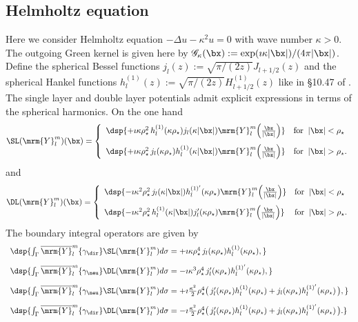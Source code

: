 \documentclass[a4paper,11pt]{article}
\begin{document}
\subsection{Helmholtz equation}\label{Helmholtz3D}

Here we consider Helmholtz equation $-\Delta u-\kappa^{2} u =0$ with wave number $\kappa>0$. The outgoing Green kernel
is given here by $\mathscr{G}_{\kappa}(\bx):=\exp(\imath\kappa\vert\bx\vert)/(4\pi\vert \bx\vert)$.
Define the spherical Bessel functions $j_{l}(z) := \sqrt{\pi/(2z)}J_{l+1/2}(z)$ and the spherical Hankel functions
$h_{l}^{(1)}(z):= \sqrt{\pi/(2z)}H^{(1)}_{l+1/2}(z)$ like in \S 10.47 of \cite{MR2723248}.
The single layer and double layer potentials admit explicit expressions in terms of the spherical harmonics.
On the one hand\\
$$
\SL(\mrm{Y}_{l}^{m})(\bx) =
\left\{\begin{array}{ll}
\dsp{+\imath\kappa\rho_{\star}^{2}\, h^{(1)}_{l}(\kappa\rho_{\star})j_{l}(\kappa\vert \bx\vert)\mrm{Y}_{l}^{m}\Big(\frac{\bx}{\vert\bx\vert}\Big)} & \textrm{for}\;\;\vert \bx\vert<\rho_{\star}\\[10pt]
\dsp{+\imath\kappa\rho_{\star}^{2}\, j_{l}(\kappa\rho_{\star})h^{(1)}_{l}(\kappa\vert \bx\vert)\mrm{Y}_{l}^{m}\Big(\frac{\bx}{\vert\bx\vert}\Big)   } & \textrm{for}\;\;\vert\bx\vert>\rho_{\star}.
\end{array}\right.
$$
and
$$
\DL(\mrm{Y}_{l}^{m})(\bx) =
\left\{\begin{array}{ll}
\dsp{-\imath\kappa^{2}\rho_{\star}^{2}\, j_{l}(\kappa\vert \bx\vert)h^{(1)'}_{l}(\kappa\rho_{\star})
\mrm{Y}_{l}^{m}\Big(\frac{\bx}{\vert\bx\vert}\Big) }
& \textrm{for}\;\;\vert\bx\vert<\rho_{\star}\\[10pt]
\dsp{-\imath\kappa^{2}\rho_{\star}^{2}\, h^{(1)}_{l}(\kappa\vert \bx\vert)j_{l}'(\kappa\rho_{\star})
\mrm{Y}_{l}^{m}\Big(\frac{\bx}{\vert\bx\vert}\Big) }
& \textrm{for}\;\;\vert\bx\vert>\rho_{\star}.
\end{array}\right.
$$
The boundary integral operators are given by
$$
\begin{array}{l}
\dsp{ \int_{\Gamma}\overline{\mrm{Y}}_{l}^{m}\{\gamma_{\dir}\}\SL(\mrm{Y}_{l}^{m}) d\sigma 
= +\imath\kappa \rho_{\star}^{4}\,j_{l}(\kappa\rho_{\star})h_{l}^{(1)}(\kappa\rho_{\star}), }\\[10pt]
\dsp{ \int_{\Gamma}\overline{\mrm{Y}}_{l}^{m}\{\gamma_{\neu}\}\DL(\mrm{Y}_{l}^{m}) d\sigma 
= -\imath\kappa^{3}\rho_{\star}^{4} \,j_{l}'(\kappa\rho_{\star})h_{l}^{(1)'}(\kappa\rho_{\star}), }\\[10pt]
\dsp{ \int_{\Gamma}\overline{\mrm{Y}}_{l}^{m}\{\gamma_{\neu}\}\SL(\mrm{Y}_{l}^{m}) d\sigma 
= +\imath\frac{\kappa^{2}}{2}\rho_{\star}^{4}
\big( \,j_{l}'(\kappa\rho_{\star})h_{l}^{(1)}(\kappa\rho_{\star}) +  j_{l}(\kappa\rho_{\star})h_{l}^{(1)'}(\kappa\rho_{\star})\,\big), }\\[10pt]
\dsp{ \int_{\Gamma}\overline{\mrm{Y}}_{l}^{m}\{\gamma_{\dir}\}\DL(\mrm{Y}_{l}^{m}) d\sigma 
= -\imath\frac{\kappa^{2}}{2}\rho_{\star}^{4}
\big( \,j_{l}'(\kappa\rho_{\star})h_{l}^{(1)}(\kappa\rho_{\star}) +  
j_{l}(\kappa\rho_{\star})h_{l}^{(1)'}(\kappa\rho_{\star})\,\big). }
\end{array}
$$
\end{document}
